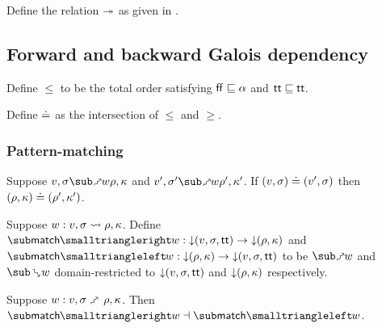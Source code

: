 \begin{definition}
   \label{def:core-language:closeDefs}
   Define the relation $\twoheadrightarrow$ as given in .
\end{definition}

\subsection{Forward and backward Galois dependency}



\begin{definition}
   Define $\leq$ to be the total order satisfying $\mathsf{ff} \sqsubseteq \alpha$ and $\mathsf{tt} \sqsubseteq \mathsf{tt}$.
\end{definition}

\begin{definition}
   Define $\doteq$ as the intersection of $\leq$ and $\geq$.
\end{definition}




\subsubsection{Pattern-matching}




\begin{lemma}
   Suppose $v, \sigma \matchFwdR{w} \rho, \kappa$ and $v', \sigma' \matchFwdR{w} \rho', \kappa'$. If $(v, \sigma) \doteq (v', \sigma)$ then $(\rho, \kappa) \doteq (\rho', \kappa')$.
\end{lemma}

\begin{definition}
   Suppose $w: v, \sigma \rightsquigarrow \rho, \kappa$. Define $\matchFwdF{w}: \Below{(v,\sigma,\TT)} \to \Below{(\rho,\kappa)}$ and $\matchBwdF{w}: \Below{(\rho,\kappa)} \to \Below{(v,\sigma,\TT)}$ to be $\matchFwdR{w}$ and $\matchBwdR{w}$ domain-restricted to ${\downarrow}{(v,\sigma,\mathsf{tt})}$ and ${\downarrow}{(\rho,\kappa)}$ respectively.
\end{definition}

\begin{theorem}
\label{thm:core-language:match:gc}
   Suppose $w: v, \sigma \matchFwdS \rho, \kappa$.  Then $\matchFwdF{w} \adjoint \matchBwdF{w}$.
\end{theorem}

